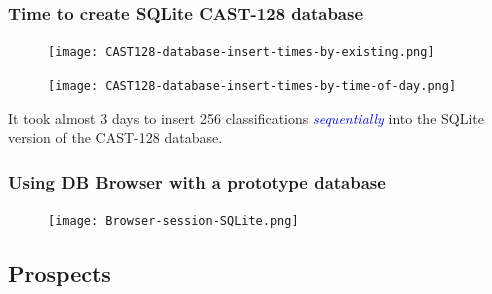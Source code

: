\documentclass[pdf,sprung,slideColor,nocolorBG]{beamer}
\newenvironment{colortheme}[1]{
\def\ProvidesPackageRCS $##1${\relax}
\renewcommand{\ProcessOptions}{\relax}
\makeatletter

\makeatother
}{}
\newcommand{\Emph}[1]{\emph{\textcolor{blue}{#1}}}
\begin{document}
\begin{colortheme}{jubata}
\begin{frame}
\frametitle{Time to create SQLite CAST-128 database}
\begin{figure}
\centering
\begin{minipage}{.49\textwidth}
  \centering
  \texttt{[image: CAST128-database-insert-times-by-existing.png]}
  \label{fig:CAST128_database_insert_times_by_existing}
\end{minipage}
\begin{minipage}{.49\textwidth}
  \centering
  \texttt{[image: CAST128-database-insert-times-by-time-of-day.png]}
  \label{fig:CAST128_database_insert_times-By_time_of_day}
\end{minipage}%
\end{figure}
It took almost 3 days to insert 256 classifications \Emph{sequentially} into the SQLite version of the CAST-128 database.
\end{frame}

\begin{frame}
\frametitle{Using DB Browser with a prototype database}
\begin{figure}
\centering
\begin{minipage}{\textwidth}
  \centering
\texttt{[image: Browser-session-SQLite.png]}
  \label{fig:Browser_session_SQLite}
\end{minipage}%
\end{figure}
\end{frame}

\end{colortheme}

\subsection{Prospects}
\end{document}
